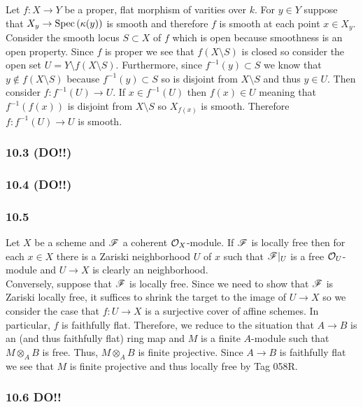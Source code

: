 \documentclass[12pt]{article}
\begin{document}
Let $f : X \to Y$ be a proper, flat morphism of varities over $k$. For $y \in Y$ suppose that $X_y \to \mathrm{Spec}\left( \kappa(y) \right)$ is smooth and therefore $f$ is smooth at each point $x \in X_y$. Consider the smooth locus $S \subset X$ of $f$ which is open because smoothness is an open property. Since $f$ is proper we see that $f(X \setminus S)$ is closed so consider the open set $U = Y \setminus f(X \setminus S)$. Furthermore, since $f^{-1}(y) \subset S$ we know that $y \notin f(X \setminus S)$ because $f^{-1}(y) \subset S$ so is disjoint from $X \setminus S$ and thus $y \in U$. Then consider $f : f^{-1}(U) \to U$. If $x \in f^{-1}(U)$ then $f(x) \in U$ meaning that $f^{-1}(f(x))$ is disjoint from $X \setminus S$ so $X_{f(x)}$ is smooth. Therefore $f : f^{-1}(U) \to U$ is smooth.

\subsubsection{10.3 (DO!!)}

\subsubsection{10.4 (DO!!)}

\subsubsection{10.5}

Let $X$ be a scheme and $\mathscr{F}$ a coherent $\mathcal{O}_{X}$-module. If $\mathscr{F}$ is locally free then for each $x \in X$ there is a Zariski neighborhood $U$ of $x$ such that $\mathscr{F}|_U$ is a free $\mathcal{O}_{U}$-module and $U \to X$ is clearly an \etale neighborhood. 
\bigskip\\
Conversely, suppose that $\mathscr{F}$ is \etale locally free. Since we need to show that $\mathscr{F}$ is Zariski locally free, it suffices to shrink the target to the image of $U \to X$ so we consider the case that $f : U \to X$ is a surjective \etale cover of affine schemes. In particular, $f$ is faithfully flat. Therefore, we reduce to the situation that $A \to B$ is an \etale (and thus faithfully flat) ring map and $M$ is a finite $A$-module such that $M \otimes_A B$ is free. Thus, $M \otimes_A B$ is finite projective. Since $A \to B$ is faithfully flat we see that $M$ is finite projective and thus locally free by Tag 058R.


\subsubsection{10.6 DO!!}
\end{document}
